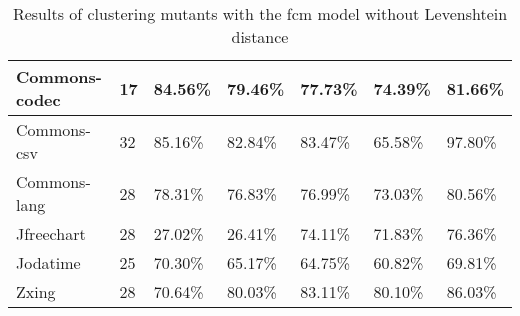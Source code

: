 \documentclass[../../main]{subfiles}
\begin{document}
\begin{table}[!htb]
\begin{tabular}{|l|l|l|l|l|l|l|}
Commons-codec         & 17                   & 84.56\%                           & 79.46\%                                                & 77.73\%                            & 74.39\%                                                                                                                                    & 81.66\%                                                                                                                                    \\ \hline
Commons-csv           & 32                   & 85.16\%                           & 82.84\%                                                & 83.47\%                            & 65.58\%                                                                                                                                    & 97.80\%                                                                                                                                    \\ \hline
Commons-lang          & 28                   & 78.31\%                           & 76.83\%                                                & 76.99\%                            & 73.03\%                                                                                                                                    & 80.56\%                                                                                                                                    \\ \hline
Jfreechart            & 28                   & 27.02\%                           & 26.41\%                                                & 74.11\%                            & 71.83\%                                                                                                                                    & 76.36\%                                                                                                                                    \\ \hline
Jodatime              & 25                   & 70.30\%                           & 65.17\%                                                & 64.75\%                            & 60.82\%                                                                                                                                    & 69.81\%                                                                                                                                    \\ \hline
Zxing                 & 28                   & 70.64\%                           & 80.03\%                                                & 83.11\%                            & 80.10\%                                                                                                                                    & 86.03\%                                                                                                                                    \\ \hline
\end{tabular}
\caption{\label{tab:ml_no_distance}Results of clustering mutants with the \acrshort{fcm} model without Levenshtein distance}
\end{table}
\end{document}
